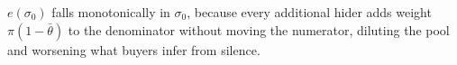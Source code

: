 $e(\sigma_0)$ falls monotonically in $\sigma_0$, because every additional hider adds weight $\pi(1-\bar{\theta})$ to the denominator without moving the numerator, diluting the pool and worsening what buyers infer from silence.
